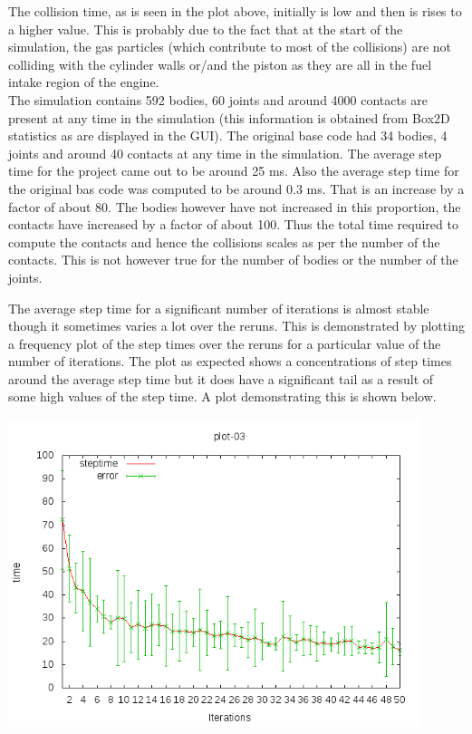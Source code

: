 \documentclass[11pt]{article}
\begin{document}
\indent The collision time, as is seen in the plot above, initially is low and then is rises to a higher value. This is probably due to the fact that at the start of the simulation, the gas particles (which contribute to most of the collisions) are not colliding with the cylinder walls or/and the piston as they are all in the fuel intake region of the engine.
\\
\indent The simulation contains 592 bodies, 60 joints and around 4000 contacts are present at any time in the simulation (this information is obtained from Box2D statistics as are displayed in the GUI). The original base code had 34 bodies, 4 joints and around 40 contacts at any time in the simulation. The average step time for the project came out to be around 25 ms. Also the average step time for the original bas code was computed to be around 0.3 ms. That is an increase by a factor of about 80. The bodies however have not increased in this proportion, the contacts have increased by a factor of about 100. Thus the total time required to compute the contacts and hence the collisions scales as per the number of the contacts. This is not however true for the number of bodies or the number of the joints.


\indent The average step time for a significant number of iterations is almost stable though it sometimes varies a lot over the reruns. This is demonstrated by plotting a frequency plot of the step times over the reruns for a particular value of the number of iterations. The plot as expected shows a concentrations of step times around the average step time but it does have a significant tail as a result of some high values of the step time. A plot demonstrating this is shown below.

\begin{center}
	\includegraphics[width=12cm]{./images/plots/g04_plot03.png}
\end{center}
\end{document}
